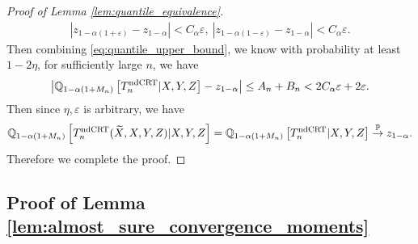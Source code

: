 \documentclass[12pt]{article}
\theoremstyle{definition}
\newcommand{\Q}{\mathbb{Q}}								%
\newcommand{\convp}{\overset{\mathbb{P}}{\rightarrow}}             %
\newcommand{\srx}{X}									%
\newcommand{\srz}{Z}									%
\newcommand{\srxk}{\widetilde X}						%
\newcommand{\sry}{Y}									%
\newcommand{\ndCRThat}{\textnormal{ndCRT}}	%
\begin{document}
\begin{proof}[Proof of Lemma \ref{lem:quantile_equivalence}]
    \begin{align*}
      |z_{1-\alpha(1+\varepsilon)}-z_{1-\alpha}| < C_\alpha\varepsilon,\ |z_{1-\alpha(1-\varepsilon)}-z_{1-\alpha}|< C_\alpha\varepsilon.
    \end{align*}
    Then combining \eqref{eq:quantile_upper_bound}, we know with probability at least $1-2\eta$, for sufficiently large $n$, we have 
    \begin{align*}
      \left|\Q_{1-\alpha(1+M_n)}\left[T_n^{\ndCRThat}|\srx,\sry,\srz\right] - z_{1-\alpha}\right|\leq A_n+B_n< 2C_\alpha\varepsilon + 2\varepsilon.
    \end{align*}
    Then since $\eta,\varepsilon$ is arbitrary, we have
    \begin{align*}
		\Q_{1-\alpha(1+M_n)}\left[T_n^{\ndCRThat}(\srxk,\srx,\sry,\srz)|\srx,\sry,\srz\right]=\Q_{1-\alpha(1+M_n)}\left[T_n^{\ndCRThat}|\srx,\sry,\srz\right]\convp z_{1-\alpha}.
    \end{align*}
    Therefore we complete the proof.
  \end{proof}



\subsection{Proof of Lemma \ref{lem:almost_sure_convergence_moments}}
\end{document}

